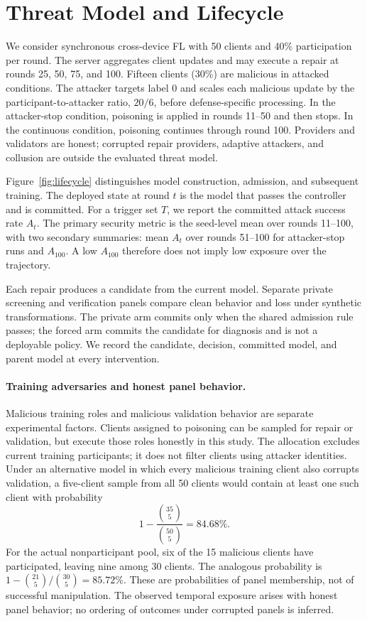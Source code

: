 \documentclass[sigconf,review,anonymous]{acmart}
\begin{document}
\section{Threat Model and Lifecycle}

We consider synchronous cross-device FL with 50 clients and 40\% participation per round. The server aggregates client updates and may execute a repair at rounds 25, 50, 75, and 100. Fifteen clients (30\%) are malicious in attacked conditions. The attacker targets label 0 and scales each malicious update by the participant-to-attacker ratio, $20/6$, before defense-specific processing. In the attacker-stop condition, poisoning is applied in rounds 11--50 and then stops. In the continuous condition, poisoning continues through round 100. Providers and validators are honest; corrupted repair providers, adaptive attackers, and collusion are outside the evaluated threat model.

Figure~\ref{fig:lifecycle} distinguishes model construction, admission, and subsequent training. The deployed state at round $t$ is the model that passes the controller and is committed. For a trigger set $T$, we report the committed attack success rate $A_t$. The primary security metric is the seed-level mean over rounds 11--100, with two secondary summaries: mean $A_t$ over rounds 51--100 for attacker-stop runs and $A_{100}$. A low $A_{100}$ therefore does not imply low exposure over the trajectory.

Each repair produces a candidate from the current model. Separate private screening and verification panels compare clean behavior and loss under synthetic transformations. The private arm commits only when the shared admission rule passes; the forced arm commits the candidate for diagnosis and is not a deployable policy. We record the candidate, decision, committed model, and parent model at every intervention.

\paragraph{Training adversaries and honest panel behavior.}
Malicious training roles and malicious validation behavior are separate experimental factors. Clients assigned to poisoning can be sampled for repair or validation, but execute those roles honestly in this study. The allocation excludes current training participants; it does not filter clients using attacker identities. Under an alternative model in which every malicious training client also corrupts validation, a five-client sample from all 50 clients would contain at least one such client with probability
\begin{equation}
 1-\frac{\binom{35}{5}}{\binom{50}{5}}=84.68\%.
\end{equation}
For the actual nonparticipant pool, six of the 15 malicious clients have participated, leaving nine among 30 clients. The analogous probability is $1-\binom{21}{5}/\binom{30}{5}=85.72\%$. These are probabilities of panel membership, not of successful manipulation. The observed temporal exposure arises with honest panel behavior; no ordering of outcomes under corrupted panels is inferred.
\end{document}
